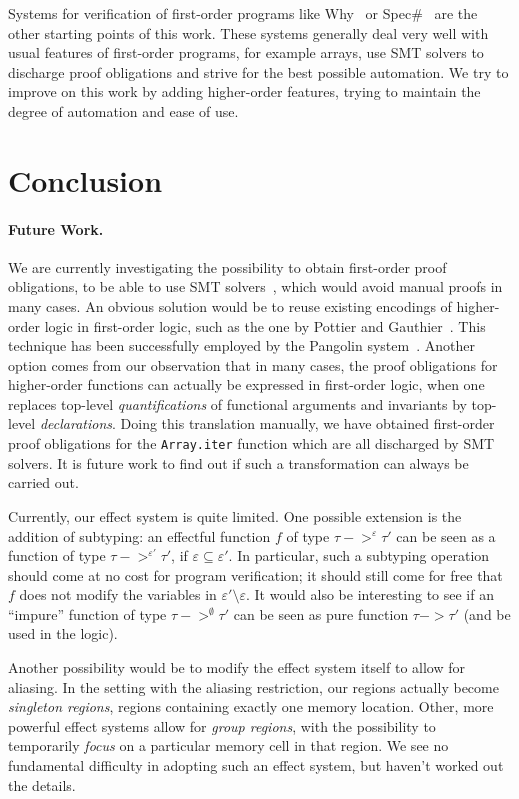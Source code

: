\documentclass[a4paper]{llncs}
\begin{document}
Systems for verification of first-order programs like
Why~\cite{Filliatre00a} or Spec\#~\cite{BarnettLS04} are the other
starting points of this work. These systems generally deal very well
with usual features of first-order programs, for example arrays, use
SMT solvers to discharge proof obligations and strive for the best
possible automation. We try to improve on this work by adding
higher-order features, trying to maintain the degree of automation and
ease of use.
\section{Conclusion}
\label{sec:conclusion}

\paragraph{Future Work.}

We are currently investigating the possibility to obtain first-order proof
obligations, to be able to use SMT solvers~\cite{RanTin-SMTLIB}, which would
avoid manual proofs in many cases. An obvious solution would be to reuse
existing encodings of higher-order logic in first-order logic, such as the one
by Pottier and Gauthier~\cite{pottier-gauthier-hosc}. This technique has been
successfully employed by the Pangolin system~\cite{regis-gianas-pottier-08}.
Another option comes from our observation that in many cases, the proof
obligations for higher-order functions can actually be expressed in
first-order logic, when one replaces top-level {\em quantifications} of
functional arguments and invariants by top-level {\em declarations}. Doing
this translation manually, we have obtained first-order proof
obligations for the {\tt Array.iter} function which are all discharged by
SMT solvers. It is future work to find out if such a transformation can always
be carried out.

Currently, our effect system is quite limited. One possible extension is the
addition of subtyping: an effectful function $f$ of type $τ ->^ετ'$ can be seen
as a function of type $τ ->^{ε'}τ'$, if $ε\subseteq ε'$. In particular, such a
subtyping operation should come at no cost for program verification; it should
still come for free that $f$ does not modify the variables in $ε'\setminus ε$. It
would also be interesting to see if an ``impure'' function of type $τ
->^\emptyset τ'$ can be seen as pure function $τ -> τ'$ (and be used in the
logic).

Another possibility would be to modify the effect system itself to allow for
aliasing. In the setting with the aliasing restriction, our regions actually
become {\em singleton regions}, regions containing exactly one memory
location. Other, more powerful effect systems allow for {\em group regions},
with the possibility to temporarily {\em focus } on a particular memory cell
in that region. We see no fundamental difficulty in adopting such an effect
system, but haven't worked out the details.
\end{document}
